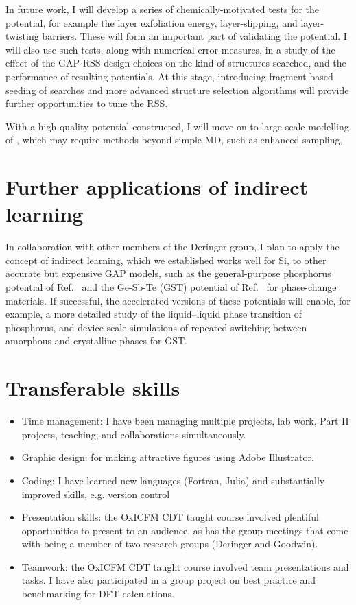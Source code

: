 \documentclass[12pt,a4paper,twoside,nobind]{ociamthesis}
\begin{document}
In future work, I will develop a series of chemically-motivated tests
 for the potential, for example the layer exfoliation energy, layer-slipping, and layer-twisting barriers. 
 These will form an important part of validating the potential. 
 I will also use such tests, along with numerical error measures,
 in a study of the effect of the GAP-RSS design choices on the kind of structures searched, and the performance of resulting potentials. 
 At this stage, introducing fragment-based seeding of searches and more advanced structure selection algorithms will
 provide further opportunities to tune the RSS.

 With a high-quality  potential constructed, I will move on to large-scale modelling of , which may require methods beyond simple MD, such as enhanced sampling, 


\section{Further applications of indirect learning}

In collaboration with other members of the Deringer group, I plan to apply the concept of indirect learning, which we established works well for Si, to other accurate but expensive GAP models, such as the general-purpose phosphorus potential
of Ref.\ \cite{Deringer2020} and the Ge-Sb-Te (GST) potential of Ref.\ \cite{Zhou2022} for phase-change materials. If successful, the accelerated versions of these potentials will enable, for example, a more detailed study of the liquid--liquid phase
transition of phosphorus, and device-scale simulations of repeated switching between amorphous and crystalline phases for GST.


\clearpage
%
\printbibliography

%
\clearpage
\startappendices
\small
\section*{Transferable skills}
\begin{itemize}
  \item Time management: I have been managing multiple projects, lab work, Part II projects, teaching, and collaborations simultaneously.
  \item Graphic design: for making attractive figures using Adobe Illustrator.
  \item Coding: I have learned new languages (Fortran, Julia) and substantially improved skills, e.g. version control
  \item Presentation skills: the OxICFM CDT taught course involved plentiful opportunities to present to an audience, as has the group meetings that come with being a member of two research groups (Deringer and Goodwin).
  \item Teamwork: the OxICFM CDT taught course involved team presentations and tasks. I have also participated in a group project on best practice and benchmarking for DFT calculations.
\end{itemize}
\end{document}
